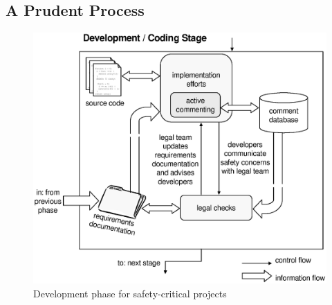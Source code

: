 \subsection{A Prudent Process}

\begin{figure}[t]
\begin{narrow}{-1.25in}{0in}
\begin{center}
\includegraphics[width=\textwidth]{images/prudence.eps}
\end{center}
\end{narrow}
\caption{Development phase for safety-critical projects}
\label{fig:prudence}
\end{figure}

